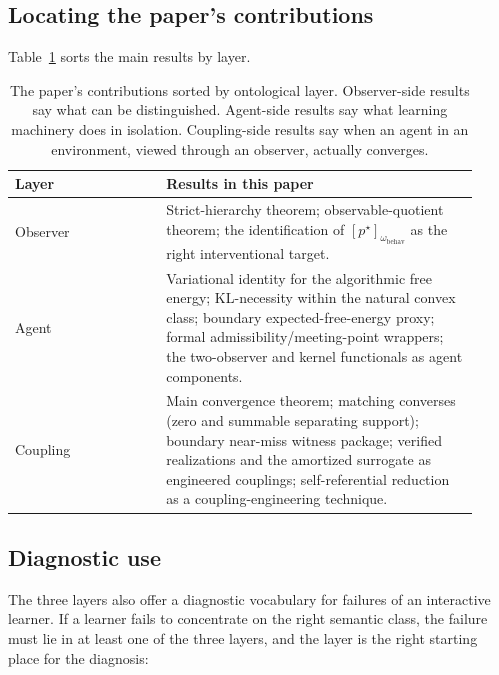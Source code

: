 \documentclass[11pt]{article}
\theoremstyle{definition}
\theoremstyle{remark}
\theoremstyle{plain}
\theoremstyle{definition}
\begin{document}
\subsection{Locating the paper's contributions}
\label{sec:ontology-locator}

Table~\ref{tab:ontology} sorts the main results by layer.

\begin{table}[h]
\centering\small
\begin{tabular}{p{0.30\linewidth}p{0.62\linewidth}}
\toprule
Layer & Results in this paper \\
\midrule
Observer & Strict-hierarchy theorem; observable-quotient theorem; the identification of $[p^\star]_{\omega_{\mathrm{behav}}}$ as the right interventional target. \\
Agent & Variational identity for the algorithmic free energy; KL-necessity within the natural convex class; boundary expected-free-energy proxy; formal admissibility/meeting-point wrappers; the two-observer and kernel functionals as agent components. \\
Coupling & Main convergence theorem; matching converses (zero and summable separating support); boundary near-miss witness package; verified realizations and the amortized surrogate as engineered couplings; self-referential reduction as a coupling-engineering technique. \\
\bottomrule
\end{tabular}
\caption{The paper's contributions sorted by ontological layer. Observer-side results say what can be distinguished. Agent-side results say what learning machinery does in isolation. Coupling-side results say when an agent in an environment, viewed through an observer, actually converges.}
\label{tab:ontology}
\end{table}

\subsection{Diagnostic use}
\label{sec:ontology-diagnostic}

The three layers also offer a diagnostic vocabulary for failures of an interactive learner. If a learner fails to concentrate on the right semantic class, the failure must lie in at least one of the three layers, and the layer is the right starting place for the diagnosis:
\end{document}
